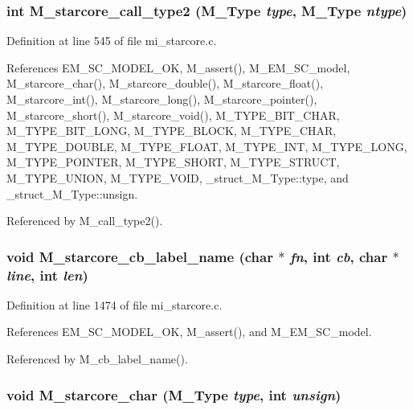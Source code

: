 \subsubsection{\setlength{\rightskip}{0pt plus 5cm}int M\_\-starcore\_\-call\_\-type2 (\bf{M\_\-Type} {\em type}, \bf{M\_\-Type} {\em ntype})}\label{mi__starcore_8c_6f547e5dd50c6c8d45a4202e285adf89}




Definition at line 545 of file mi\_\-starcore.c.

References EM\_\-SC\_\-MODEL\_\-OK, M\_\-assert(), M\_\-EM\_\-SC\_\-model, M\_\-starcore\_\-char(), M\_\-starcore\_\-double(), M\_\-starcore\_\-float(), M\_\-starcore\_\-int(), M\_\-starcore\_\-long(), M\_\-starcore\_\-pointer(), M\_\-starcore\_\-short(), M\_\-starcore\_\-void(), M\_\-TYPE\_\-BIT\_\-CHAR, M\_\-TYPE\_\-BIT\_\-LONG, M\_\-TYPE\_\-BLOCK, M\_\-TYPE\_\-CHAR, M\_\-TYPE\_\-DOUBLE, M\_\-TYPE\_\-FLOAT, M\_\-TYPE\_\-INT, M\_\-TYPE\_\-LONG, M\_\-TYPE\_\-POINTER, M\_\-TYPE\_\-SHORT, M\_\-TYPE\_\-STRUCT, M\_\-TYPE\_\-UNION, M\_\-TYPE\_\-VOID, \_\-struct\_\-M\_\-Type::type, and \_\-struct\_\-M\_\-Type::unsign.

Referenced by M\_\-call\_\-type2().
\subsubsection{\setlength{\rightskip}{0pt plus 5cm}void M\_\-starcore\_\-cb\_\-label\_\-name (char $\ast$ {\em fn}, int {\em cb}, char $\ast$ {\em line}, int {\em len})}\label{mi__starcore_8c_4cbf5e30a247c47103a5ba69a511a3cb}




Definition at line 1474 of file mi\_\-starcore.c.

References EM\_\-SC\_\-MODEL\_\-OK, M\_\-assert(), and M\_\-EM\_\-SC\_\-model.

Referenced by M\_\-cb\_\-label\_\-name().
\subsubsection{\setlength{\rightskip}{0pt plus 5cm}void M\_\-starcore\_\-char (\bf{M\_\-Type} {\em type}, int {\em unsign})}\label{mi__starcore_8c_2b8988132427cd14863cf2bf9fce1a65}




